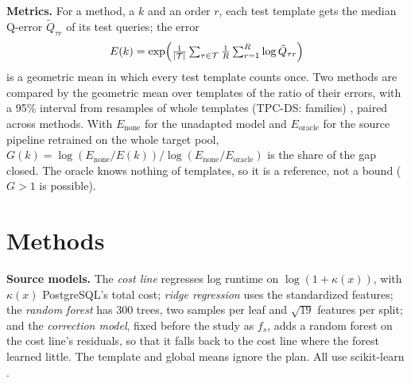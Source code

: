 \documentclass{article}
\begin{document}
\textbf{Metrics.} For a method, a $k$ and an order $r$, each test template gets the median Q-error $\tilde Q_{\tau r}$ of its test queries; the error
\begin{equation}
E(k)=\exp\Bigl(\tfrac{1}{|\mathcal T|}\textstyle\sum_{\tau\in\mathcal T}\tfrac1R\sum_{r=1}^R\log\tilde Q_{\tau r}\Bigr)
\end{equation}
is a geometric mean in which every test template counts once. Two methods are compared by the geometric mean over templates of the ratio of their errors, with a 95\% interval from \EvalBootstrap{} resamples of whole templates (TPC-DS: families) \parencite{efron1993}, paired across methods. With $E_{\mathrm{none}}$ for the unadapted model and $E_{\mathrm{oracle}}$ for the source pipeline retrained on the whole target pool, $G(k)=\log(E_{\mathrm{none}}/E(k))/\log(E_{\mathrm{none}}/E_{\mathrm{oracle}})$ is the share of the gap closed. The oracle knows nothing of templates, so it is a reference, not a bound ($G>1$ is possible).

\section{Methods}
\label{sec:methods}
\textbf{Source models.} The \emph{cost line} regresses log runtime on $\log(1+\kappa(x))$, with $\kappa(x)$ PostgreSQL's total cost; \emph{ridge regression} \parencite{hoerl1970} uses the standardized features; the \emph{random forest} \parencite{breiman2001} has 300 trees, two samples per leaf and $\sqrt{19}$ features per split; and the \emph{correction model}, fixed before the study as $f_s$, adds a random forest on the cost line's residuals, so that it falls back to the cost line where the forest learned little. The template and global means ignore the plan. All use scikit-learn \parencite{pedregosa2011}.
\end{document}
